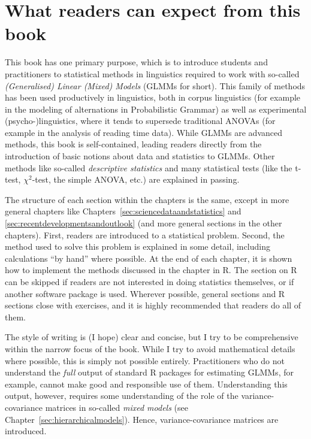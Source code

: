 
\section*{What readers can expect from this book}

This book has one primary purpose, which is to introduce students and practitioners to statistical methods in linguistics required to work with so-called \textit{(Generalised) Linear (Mixed) Models} (GLMMs for short).
This family of methods has been used productively in linguistics, both in corpus linguistics (for example in the modeling of alternations in Probabilistic Grammar) as well as experimental (psycho-)linguistics, where it tends to supersede traditional ANOVAs (for example in the analysis of reading time data).
While GLMMs are advanced methods, this book is self-contained, leading readers directly from the introduction of basic notions about data and statistics to GLMMs.
Other methods like so-called \textit{descriptive statistics} and many statistical tests (like the t-test, $\chi^2$-test, the simple ANOVA, etc.) are explained in passing.

The structure of each section within the chapters is the same, except in more general chapters like Chapters~\ref{sec:sciencedataandstatistics} and \ref{sec:recentdevelopmentsandoutlook} (and more general sections in the other chapters).
First, readers are introduced to a statistical problem.
Second, the method used to solve this problem is explained in some detail, including calculations ``by hand'' where possible.
At the end of each chapter, it is shown how to implement the methods discussed in the chapter in R.
The section on R can be skipped if readers are not interested in doing statistics themselves, or if another software package is used.
Wherever possible, general sections and R sections close with exercises, and it is highly recommended that readers do all of them.

The style of writing is (I hope) clear and concise, but I try to be comprehensive within the narrow focus of the book.
While I try to avoid mathematical details where possible, this is simply not possible entirely.
Practitioners who do not understand the \textit{full} output of standard R packages for estimating GLMMs, for example, cannot make good and responsible use of them.
Understanding this output, however, requires some understanding of the role of the variance-covariance matrices in so-called \textit{mixed models} (see Chapter~\ref{sec:hierarchicalmodels}).
Hence, variance-covariance matrices are introduced.

